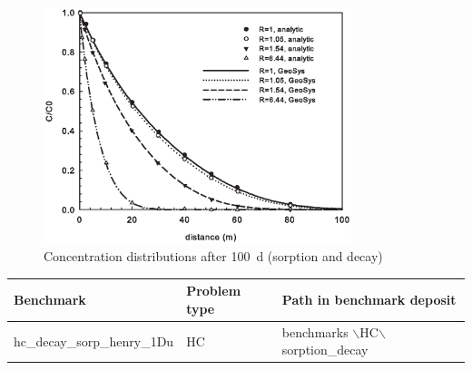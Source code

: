\begin{figure}[htbp]
\centering
\includegraphics[width=0.8\textwidth]{C/figures/fig58.EPS}
\caption{Concentration distributions after 100~d (sorption and decay)}
\label{fig58}
\end{figure}

\begin{tabular}{|l|l|l|}
\hline
Benchmark & Problem type	& Path in benchmark deposit \\
\hline	
hc\_decay\_sorp\_henry\_1Du	& HC	& benchmarks $\backslash$HC$\backslash$sorption\_decay \\
\hline	
\end{tabular}
